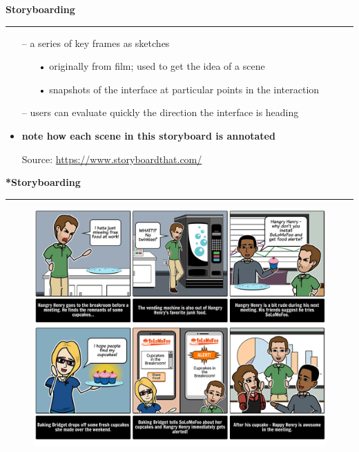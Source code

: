 \documentclass[pdf]{beamer}
\begin{document}
\begin{frame}
\vspace{8mm}
\textcolor{myBlue}{\textbf{\Large{Storyboarding}}}

\textcolor{red}{\rule{10cm}{1mm}}

\begin{itemize}
      \item[\textcolor{black}{--}] a series of key frames as sketches
      \begin{itemize}
        \item[\textcolor{black}{•}] originally from film; used to get the idea of a scene
        \item[\textcolor{black}{•}] snapshots of the interface at particular points in the interaction
      \end{itemize}
      \item[\textcolor{black}{--}] users can evaluate quickly the direction the interface is heading
      \newline
      \item \textbf{note how each scene in this storyboard is annotated}
      
      Source: \url{https://www.storyboardthat.com/}
      
  \end{itemize}
\end{frame}



\begin{frame}
\vspace{8mm}
\textcolor{myBlue}{\textbf{\Large{*Storyboarding}}}

\textcolor{red}{\rule{10cm}{1mm}}

\begin{figure}[b]
  	\includegraphics[scale = 0.22]{solomofoo-product-pitch.png}
\end{figure}
    
\end{frame}
\end{document}
